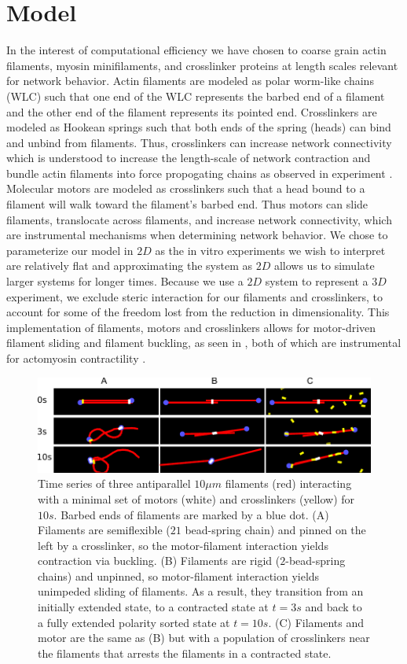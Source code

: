 \documentclass[12pt]{article}
\begin{document}
\section{Model}  
In the interest of computational efficiency we have chosen to coarse grain actin filaments, myosin minifilaments, and
crosslinker proteins at length scales relevant for network behavior. Actin filaments are
modeled as polar worm-like chains (WLC) such that one end of the WLC represents the barbed end of a filament and the
other end of the filament represents its pointed end.  
Crosslinkers are modeled as Hookean springs such
that both ends of the spring (heads) can bind and unbind from filaments. Thus, crosslinkers can increase network connectivity
which is understood to increase the length-scale of network contraction \cite{murrell2015} and bundle actin filaments
into force propogating chains as observed in experiment \cite{gardel2004, murrell2012, murrell2014, freedman2016}. 
Molecular motors are modeled as crosslinkers such
that a head bound to a filament will walk toward the filament's barbed end. Thus motors can slide filaments,
translocate across filaments, and increase network connectivity, which are instrumental mechanisms when determining
network behavior\cite{murrell2014}. We chose to parameterize our model in $2D$ as the in vitro experiments we wish to
interpret are relatively flat and
approximating the system as $2D$ allows us to simulate larger systems for longer times. Because we use a $2D$ system to
represent a $3D$ experiment, we exclude steric interaction for our filaments and crosslinkers, to account for
some of the freedom lost from the reduction in dimensionality. This implementation of filaments, motors and crosslinkers allows for 
motor-driven filament sliding and filament buckling, as seen in ,
both of which are instrumental for actomyosin contractility \cite{murrell2012}.
\begin{figure}[H]  
  \centering
  \includegraphics[width=\textwidth]{figs/minimal.pdf}
  \caption{
  \label{fig:toys}%
  Time series of three antiparallel $10\mu m$ filaments (red) interacting with a
  minimal set of motors (white) and crosslinkers (yellow) for $10s$. Barbed ends
  of filaments are marked by a blue dot.  
  (A) Filaments are semiflexible ($21$ bead-spring chain) and pinned on the left
  by a crosslinker, so the motor-filament interaction yields contraction via buckling. 
  (B) Filaments are rigid ($2$-bead-spring chains) and unpinned, so 
  motor-filament interaction yields unimpeded sliding of filaments. As a result,
  they transition from an initially extended state, to a contracted state
  at $t=3s$ and back to a fully extended polarity sorted state at $t=10s$.
  (C) Filaments and motor are the same as (B) but with a population of
crosslinkers near the filaments that arrests the filaments in a contracted state. } 
\end{figure}
\end{document}
